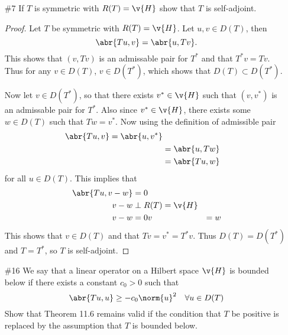 \documentclass[11pt, oneside]{article}
\begin{document}
\begin{enumerate}
  \pagebreak
  \item[\#7] %
    If $T$ is symmetric with $R(T) = \v{H}$ show that $T$ is self-adjoint.

    \begin{proof}
      Let $T$ be symmetric with $R(T) = \v{H}$.
      Let $u, v \in D(T)$, then
      \[
        \abr{Tu, v} = \abr{u, Tv}.
      \]
      This shows that $(v, Tv)$ is an admissable pair for $T^*$ and that
      $T^* v = Tv$.
      Thus for any $v \in D(T)$, $v \in D(T^*)$, which shows that
      $D(T) \subset D(T^*)$.

      Now let $v \in D(T^*)$, so that there exists $v^* \in \v{H}$ such that
      $(v, v^*)$ is an admissable pair for $T^*$.
      Also since $v^* \in \v{H}$, there exists some $w \in D(T)$ such that
      $Tw = v^*$.
      Now using the definition of admissible pair
      \begin{align*}
        \abr{Tu, v} = \abr{u, v^*} \\
        &= \abr{u, Tw} \\
        &= \abr{Tu, w}
      \end{align*}
      for all $u \in D(T)$.
      This implies that
      \begin{align*}
        \abr{Tu, v - w} &= 0 \\
        v - w &\perp R(T) = \v{H}\\
        v - w &= 0
        v &= w
      \end{align*}
      This shows that $v \in D(T)$ and that $Tv = v^* = T^* v$.
      Thus $D(T) = D(T^*)$ and $T = T^*$, so $T$ is self-adjoint.
    \end{proof}

  \pagebreak
  \item[\#16] %
    We say that a linear operator on a Hilbert space $\v{H}$ is bounded below
    if there exists a constant $c_0 > 0$ such that
    \[
      \abr{Tu, u} \ge -c_0 \norm{u}^2 \quad \forall u \in D(T)
    \]
    Show that Theorem 11.6 remains valid if the condition that $T$ be positive
    is replaced by the assumption that $T$ is bounded below.


\end{enumerate}
\end{document}

